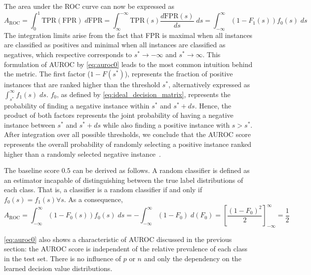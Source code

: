 The area under the ROC curve can now be expressed as
%
\begin{equation}
    A_\text{ROC}
    = \int_{0}^{1} \text{TPR}(\text{FPR}) \;d\text{FPR}
    = \int_{\infty}^{-\infty} \text{TPR}(s) \frac{d\text{FPR}(s)}{ds} \;ds
    = \int_{-\infty}^{\infty} (1 - F_1(s)) f_0(s) \;ds
    \label{auroc0}
\end{equation}
%
The integration limits arise from the fact that FPR is maximal when all instances are classified as positives
and minimal when all instances are classified as negatives, which respective corresponds to $s^* \to -\infty$ and $s^* \to \infty$. This formulation of AUROC by \autoref{eq:auroc0} leads to the most common intuition behind the metric.
%
The first factor ($1- F(s^*)$), represents the fraction of positive instances that are ranked higher than the threshold $s^*$, alternatively expressed as $\int_{s^*}^{\infty}f_1(s)\; ds$. $f_0$, as defined by \autoref{eq:ideal_decision_matrix}, represents the probability of finding a negative instance within $s^*$ and $s^* + ds$. Hence, the product of both factors represents the joint probability of having a negative instance between $s^*$ and $s^* + ds$ while also finding a positive instance with $s > s^\ast$. 
%
After integration over all possible thresholds, we conclude that the AUROC score represents the overall probability of randomly selecting a positive instance ranked higher than a randomly selected negative instance~\cite{}.

The baseline score $0.5$ can be derived as follows. A random classifier is defined as an estimator incapable of distinguishing between the true label distributions of each class. That is, a classifier is a random classifier if and only if $f_0(s) = f_1(s) \forall s$. As a consequence,
%
\begin{equation}
    A_\text{ROC}
    = \int_{-\infty}^{\infty} (1 - F_0(s)) f_0(s) \;ds
    = -\int_{-\infty}^{\infty} (1 - F_0) \;d(F_0)
    = \left[\frac{(1-F_0)^2}{2}\right]_{-\infty}^{\infty}
    = \frac{1}{2}
    \label{auroc_random}
\end{equation}
 
\autoref{eq:auroc0} also shows a characteristic of AUROC discussed in the previous section: the AUROC score is independent of the relative prevalence of each class in the test set. There is no influence of $p$ or $n$ and only the dependency on the learned decision value distributions.
%

